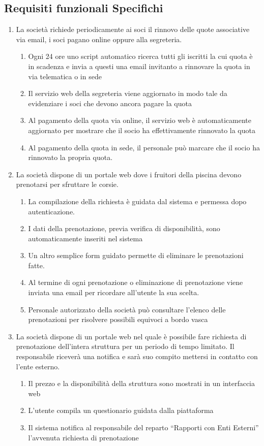\documentclass[11pt]{article} %
\begin{document}
\subsection{Requisiti funzionali Specifichi}

\begin{enumerate}
	\item La società richiede periodicamente ai soci il rinnovo delle quote associative via email, i soci pagano online oppure alla segreteria.
	\begin{enumerate}
		\item Ogni 24 ore uno script automatico ricerca tutti gli iscritti la cui quota è in scadenza e invia a questi una email invitanto a rinnovare la quota in via telematica o in sede
		\item Il servizio web della segreteria viene aggiornato in modo tale da evidenziare i soci che devono ancora pagare la quota
		\item Al pagamento della quota via online, il servizio web è automaticamente aggiornato per mostrare che il socio ha effettivamente rinnovato la quota
		\item Al pagamento della quota in sede, il personale può marcare che il socio ha rinnovato la propria quota.
	\end{enumerate}

	\item La società dispone di un portale web dove i fruitori della piscina devono prenotarsi per sfruttare le corsie.
	\begin{enumerate}
		\item La compilazione della richiesta è guidata dal sistema e permessa dopo autenticazione.
		\item I dati della prenotazione, previa verifica di disponibilità, sono automaticamente inseriti nel sistema
		\item Un altro semplice form guidato permette di eliminare le prenotazioni fatte.
		\item Al termine di ogni prenotazione o eliminazione di prenotazione viene inviata una email per ricordare all'utente la sua scelta.
		\item Personale autorizzato della società può consultare l'elenco delle prenotazioni per risolvere possibili equivoci a bordo vasca
	\end{enumerate}
	\item La società dispone di un portale web nel quale è possibile fare richiesta di prenotazione dell'intera struttura per un periodo di tempo limitato. Il responsabile riceverà una notifica e sarà suo compito mettersi in contatto con l'ente esterno.
	\begin{enumerate}
		\item Il prezzo e la disponibilità della struttura sono mostrati in un interfaccia web
		\item L'utente compila un questionario guidata dalla piattaforma
		\item Il sistema notifica al responsabile del reparto ``Rapporti con Enti Esterni'' l'avvenuta richiesta di prenotazione
	\end{enumerate}
	

\end{enumerate}
\end{document}
